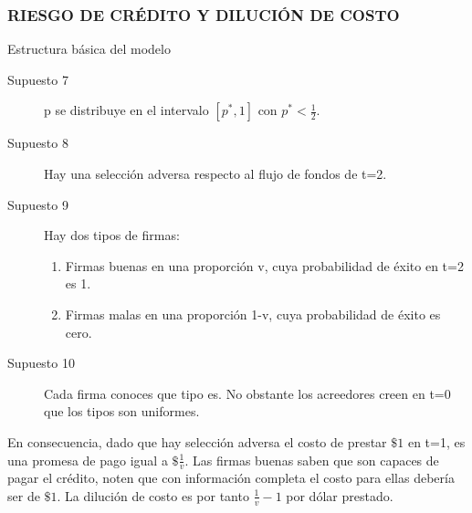 \documentclass[10pt, xcolor=table, x11names]{beamer}
\begin{document}
\begin{frame}
\frametitle{{\normalsize RIESGO DE CRÉDITO Y DILUCIÓN DE COSTO} {}}

\begin{block} {Estructura básica del modelo}
    \begin{description}
        
        \item[Supuesto 7] p se distribuye en el intervalo $\left[p^{*}, 1 \right]  $ con $p^{*}<\frac{1}{2}$.
        \item[Supuesto 8] Hay una selección adversa respecto al flujo de fondos de t=2.
        \item[Supuesto 9] Hay dos tipos de firmas:
        \begin{enumerate}
            \item Firmas buenas en una proporción v, cuya probabilidad de éxito en t=2 es 1.
            \item Firmas malas en una proporción 1-v, cuya probabilidad de éxito es cero.
        \end{enumerate}
        \item[Supuesto 10] Cada firma conoces que tipo es. No obstante los acreedores creen en t=0 que los tipos son uniformes.
        \end{description}
    
\end{block}	
En consecuencia, dado que hay selección adversa el costo de prestar $\$1$ en t=1, es una promesa de pago igual a $\$\frac{1}{v}$. Las firmas buenas saben que son capaces de pagar el crédito, noten que con información completa el costo para ellas debería ser de $\$1$. La dilución de costo es por tanto  $\frac{1}{v}-1$ por dólar prestado.
\end{frame}
\end{document}
